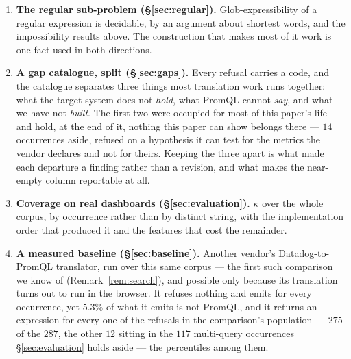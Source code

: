 \begin{enumerate}
and the paper therefore states instead, covering first the kernel
($95.7\%$ of the corpus) and then its arithmetic closure --- which is every expression
this translator emits.
\item \textbf{The regular sub-problem (\S\ref{sec:regular}).} Glob-expressibility of a
regular expression is decidable, by an argument about shortest words, and the
impossibility results above. The construction that makes most of it work is one fact used
in both directions.
\item \textbf{A gap catalogue, split (\S\ref{sec:gaps}).} Every refusal carries a code,
and the catalogue separates three things most translation work runs together: what the
target system does not \emph{hold}, what PromQL cannot \emph{say}, and what we have not
\emph{built}. The first two were occupied for most of this paper's life and hold, at the
end of it, nothing this paper can show belongs there --- $14$ occurrences aside, refused
on a hypothesis it can test for the metrics the vendor declares and not for theirs.
Keeping the three apart is what made each departure a finding rather than a revision, and
what makes the near-empty column reportable at all.
\item \textbf{Coverage on real dashboards (\S\ref{sec:evaluation}).} $\kappa$ over the
whole corpus, by occurrence rather than by distinct string, with the implementation order
that produced it and the features that cost the remainder.
\item \textbf{A measured baseline (\S\ref{sec:baseline}).} Another vendor's
Datadog-to-PromQL translator, run over this same corpus --- the first such comparison we
know of (Remark~\ref{rem:search}), and possible only because its translation turns out to
run in the browser. It
refuses nothing and emits for every occurrence, yet $5.3\%$ of what it emits is not
PromQL, and it returns an expression for every one of the refusals in the comparison's
population --- $275$ of the $287$, the other $12$ sitting in the $117$ multi-query
occurrences \S\ref{sec:evaluation} holds aside --- the percentiles among them.
\end{enumerate}

